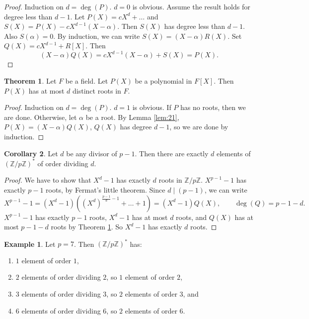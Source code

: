 \documentclass{article}
\newcommand{\Z}{\mathbb{Z}}
\newcommand{\rb}[1]{\left( #1 \right)}
\renewcommand{\sb}[1]{\left[ #1 \right]}
\theoremstyle{definition}\newtheorem{definition}{Definition}
\theoremstyle{definition}\newtheorem*{remark}{Remark}
\theoremstyle{definition}\newtheorem*{example}{Example}
\theoremstyle{definition}\newtheorem*{note}{Note}
\newtheorem{theorem}[definition]{Theorem}
\newtheorem{corollary}[definition]{Corollary}
\begin{document}
\begin{proof}
Induction on $ d = \deg\rb{P} $. $ d = 0 $ is obvious. Assume the result holds for degree less than $ d - 1 $. Let $ P\rb{X} = cX^d + \dots $ and $ S\rb{X} = P\rb{X} - cX^{d - 1}\rb{X - \alpha} $. Then $ S\rb{X} $ has degree less than $ d - 1 $. Also $ S\rb{\alpha} = 0 $. By induction, we can write $ S\rb{X} = \rb{X - \alpha}R\rb{X} $. Set $ Q\rb{X} = cX^{d - 1} + R\sb{X} $. Then
$$ \rb{X - \alpha}Q\rb{X} = cX^{d - 1}\rb{X - \alpha} + S\rb{X} = P\rb{X}. $$
\end{proof}

\begin{theorem}
\label{thm:22}
Let $ F $ be a field. Let $ P\rb{X} $ be a polynomial in $ F\sb{X} $. Then $ P\rb{X} $ has at most $ d $ distinct roots in $ F $.
\end{theorem}

\begin{proof}
Induction on $ d = \deg\rb{P} $. $ d = 1 $ is obvious. If $ P $ has no roots, then we are done. Otherwise, let $ \alpha $ be a root. By Lemma \ref{lem:21}, $ P\rb{X} = \rb{X - \alpha}Q\rb{X} $, $ Q\rb{X} $ has degree $ d - 1 $, so we are done by induction.
\end{proof}

\begin{corollary}
\label{cor:23}
Let $ d $ be any divisor of $ p - 1 $. Then there are exactly $ d $ elements of $ \rb{\Z / p\Z}^* $ of order dividing $ d $.
\end{corollary}

\begin{proof}
We have to show that $ X^d - 1 $ has exactly $ d $ roots in $ \Z / p\Z $. $ X^{p - 1} - 1 $ has exactly $ p - 1 $ roots, by Fermat's little theorem. Since $ d \mid \rb{p - 1} $, we can write
$$ X^{p - 1} - 1 = \rb{X^d - 1}\rb{\rb{X^d}^{\tfrac{p - 1}{d} - 1} + \dots + 1} = \rb{X^d - 1}Q\rb{X}, \qquad \deg\rb{Q} = p - 1 - d. $$
$ X^{p - 1} - 1 $ has exactly $ p - 1 $ roots, $ X^d - 1 $ has at most $ d $ roots, and $ Q\rb{X} $ has at most $ p - 1 - d $ roots by Theorem \ref{thm:22}. So $ X^d - 1 $ has exactly $ d $ roots.
\end{proof}

\begin{example}
Let $ p = 7 $. Then $ \rb{\Z / p\Z}^* $ has:
\begin{enumerate}
\item $ 1 $ element of order $ 1 $,
\item $ 2 $ elements of order dividing $ 2 $, so $ 1 $ element of order $ 2 $,
\item $ 3 $ elements of order dividing $ 3 $, so $ 2 $ elements of order $ 3 $, and
\item $ 6 $ elements of order dividing $ 6 $, so $ 2 $ elements of order $ 6 $.
\end{enumerate}
\end{example}
\end{document}

